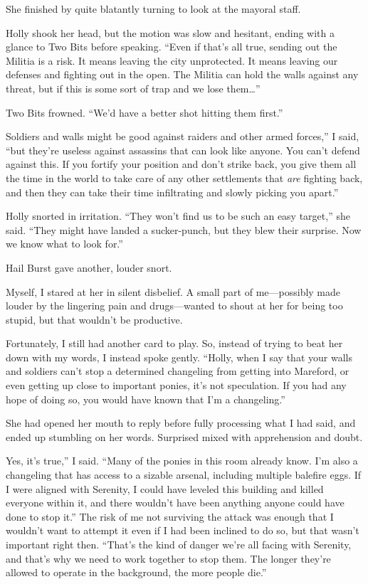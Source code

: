 She finished by quite blatantly turning to look at the mayoral staff.

Holly shook her head, but the motion was slow and hesitant, ending with a glance to Two Bits before speaking. “Even if that’s all true, sending out the Militia is a risk. It means leaving the city unprotected. It means leaving our defenses and fighting out in the open. The Militia can hold the walls against any threat, but if this is some sort of trap and we lose them…”

Two Bits frowned. “We’d have a better shot hitting them first.”

\leavevmode{}Soldiers and walls might be good against raiders and other armed forces,” I said, “but they’re useless against assassins that can look like anyone. You can’t defend against this. If you fortify your position and don’t strike back, you give them all the time in the world to take care of any other settlements that \textit{are} fighting back, and then they can take their time infiltrating and slowly picking you apart.”

Holly snorted in irritation. “They won’t find us to be such an easy target,” she said. “They might have landed a sucker-punch, but they blew their surprise. Now we know what to look for.”

Hail Burst gave another, louder snort.

Myself, I stared at her in silent disbelief. A small part of me—possibly made louder by the lingering pain and drugs—wanted to shout at her for being too stupid, but that wouldn’t be productive.

Fortunately, I still had another card to play. So, instead of trying to beat her down with my words, I instead spoke gently. “Holly, when I say that your walls and soldiers can’t stop a determined changeling from getting into Mareford, or even getting up close to important ponies, it’s not speculation. If you had any hope of doing so, you would have known that I’m a changeling.”

She had opened her mouth to reply before fully processing what I had said, and ended up stumbling on her words. Surprised mixed with apprehension and doubt.

\leavevmode{}Yes, it’s true,” I said. “Many of the ponies in this room already know. I’m also a changeling that has access to a sizable arsenal, including multiple balefire eggs. If I were aligned with Serenity, I could have leveled this building and killed everyone within it, and there wouldn’t have been anything anyone could have done to stop it.” The risk of me not surviving the attack was enough that I wouldn’t want to attempt it even if I had been inclined to do so, but that wasn’t important right then. “That’s the kind of danger we’re all facing with Serenity, and that’s why we need to work together to stop them. The longer they’re allowed to operate in the background, the more people die.”

